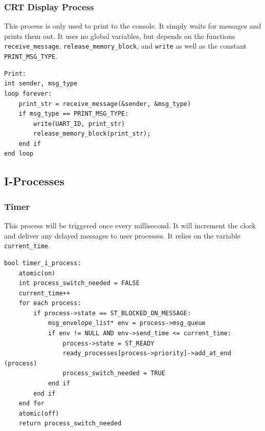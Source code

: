 \documentclass[titlepage]{article}
\begin{document}
\subsubsection{CRT Display Process}
This process is only used to print to the console.  It simply waits for messages
and prints them out.  It uses no global variables, but depends on the functions
\verb!receive_message!, \verb!release_memory_block!, and \verb!write! as well as
the constant \verb!PRINT_MSG_TYPE!.

\begin{verbatim}
Print:
int sender, msg_type
loop forever:
    print_str = receive_message(&sender, &msg_type)
    if msg_type == PRINT_MSG_TYPE:
        write(UART_ID, print_str)
        release_memory_block(print_str);
    end if
end loop
\end{verbatim}

\subsection{I-Processes}
\subsubsection{Timer}
This process will be triggered once every millisecond.  It will increment the
clock and deliver any delayed messages to user processes. It relies on the
variable \verb!current_time!.

\begin{verbatim}
bool timer_i_process:
    atomic(on)
    int process_switch_needed = FALSE
    current_time++
    for each process:
        if process->state == ST_BLOCKED_ON_MESSAGE:
            msg_envelope_list* env = process->msg_queue
            if env != NULL AND env->send_time <= current_time:
                process->state = ST_READY
                ready_processes[process->priority]->add_at_end (process)
                process_switch_needed = TRUE
            end if
        end if
    end for
    atomic(off)
    return process_switch_needed
\end{verbatim}
\end{document}
